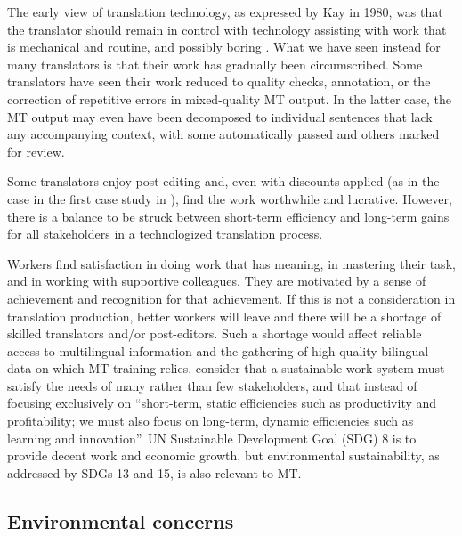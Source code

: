 \documentclass[output=paper]{langscibook}
\begin{document}
The early view of translation technology, as expressed by Kay in 1980, was that the translator should remain in control with technology assisting with work that is mechanical and routine, and possibly boring \citep{Kay1980}. What we have seen instead for many translators is that their work has gradually been circumscribed. Some translators have seen their work reduced to quality checks, annotation, or the correction of repetitive errors in mixed-quality MT output. In the latter case, the MT output may even have been decomposed to individual sentences that lack any accompanying context, with some automatically passed and others marked for review.

 Some translators enjoy post-editing and, even with discounts applied (as in the case in the first case study in ), find the work worthwhile and lucrative. However, there is a balance to be struck between short-term efficiency and long-term gains for all stakeholders in a technologized translation process.

Workers find satisfaction in doing work that has meaning, in mastering their task, and in working with supportive colleagues. They are motivated by a sense of achievement and recognition for that achievement. If this is not a consideration in translation production, better workers will leave and there will be a shortage of skilled translators and/or post-editors. Such a shortage would affect reliable access to multilingual information and the gathering of high-quality bilingual data on which MT training relies. \citet[4]{DochertyShari2008} consider that a sustainable work system must satisfy the needs of many rather than few stakeholders, and that instead of focusing exclusively on “short-term, static efficiencies such as productivity and profitability; we must also focus on long-term, dynamic efficiencies such as learning and innovation”. UN Sustainable Development Goal (SDG) 8 is to provide decent work and economic growth, but environmental sustainability, as addressed by SDGs 13 and 15, is also relevant to MT.

\subsection{Environmental concerns}
\end{document}
